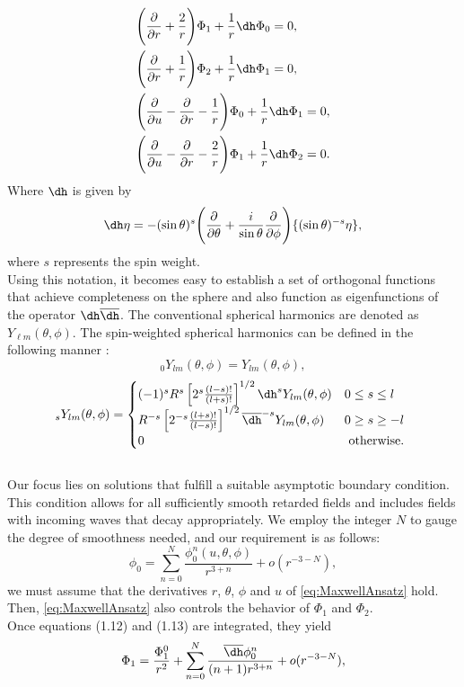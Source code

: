 \begin{align}\label{eq:MaxwellEqns}
  & \Biggl(\frac{\partial}{\partial r} + \frac{2}{r}\Biggr)\Phi_{1}  + \frac{1}{r}\dh \Phi_{0} = 0, \\ 
  & \Biggl(\frac{\partial}{\partial r} + \frac{1}{r}\Biggr)\Phi_{2}  + \frac{1}{r}\dh \Phi_{1} = 0, \\ 
  & \Biggl(\frac{\partial}{\partial u} - \frac{\partial}{\partial r} - \frac{1}{r}\Biggr)\Phi_{0}  + \frac{1}{r}\dh \Phi_{1} = 0, \\ 
  & \Biggl(\frac{\partial}{\partial u} - \frac{\partial}{\partial r} - \frac{2}{r}\Biggr)\Phi_{1}  + \frac{1}{r}\dh \Phi_{2} = 0. 
\end{align}
Where $\dh$ is given by $$\dh \eta = -(\sin \theta)^{s}\Biggl(\frac{\partial}{\partial \theta} + \frac{i}{\sin \theta}\frac{\partial}{\partial \phi}\Biggr)\{(\sin \theta)^{-s}\eta\},$$ where $s$ represents the spin weight.
\\
Using this notation, it becomes easy to establish a set of orthogonal functions that achieve completeness on the sphere and also function as eigenfunctions of the operator $\dh \overline{\dh}$. The conventional spherical harmonics are denoted as $Y_{\ell m}(\theta, \phi)$. The spin-weighted spherical harmonics can be defined in the following manner \cite{Ste91}:
\begin{equation}\label{eq:sphericalharmonics}
  { }_0 Y_{l m}(\theta, \phi)=Y_{l m}(\theta, \phi),
\end{equation}
\begin{equation}\label{eq:spinweightSH}
  { }_s Y_{l m}(\theta, \phi)= \begin{cases}(-1)^s R^s\left[2^s \frac{(l-s) !}{(l+s) !}\right]^{1 / 2} \dh^s Y_{l m}(\theta, \phi) & 0 \leq s \leq l \\ R^{-s}\left[2^{-s} \frac{(l+s) !}{(l-s) !}\right]^{1 / 2} \overline{\dh}^{-s} Y_{l m}(\theta, \phi) & 0 \geq s \geq-l \\ 0 & \text { otherwise. }\end{cases}
\end{equation}
\\
Our focus lies on solutions that fulfill a suitable asymptotic boundary condition. This condition allows for all sufficiently smooth retarded fields and includes fields with incoming waves that decay appropriately. We employ the integer $N$ to gauge the degree of smoothness needed, and our requirement is as follows:
\begin{equation}\label{eq:MaxwellAnsatz}
  \phi_{0}=\sum_{n=0}^{N}\frac{\phi_{0}^{n}(u,\theta,\phi)}{r^{3+n}}+o(r^{-3-N}),
\end{equation}
we must assume that the derivatives $r$, $\theta$, $\phi$ and $u$ of \eqref{eq:MaxwellAnsatz} hold. Then, \eqref{eq:MaxwellAnsatz} also controls the behavior of $\Phi_{1}$ and $\Phi_{2}$.\\
Once equations (1.12) and (1.13) are integrated, they yield
\begin{equation}\label{eq:Phi1}
  \Phi_{1} = \frac{\Phi_{1}^{0}}{r^2} + \sum_{n=0}^{N}\frac{\overline{\dh} \phi_{0}^{n}}{(n+1)r^{3+n}}+o(r^{-3-N}),
\end{equation}

